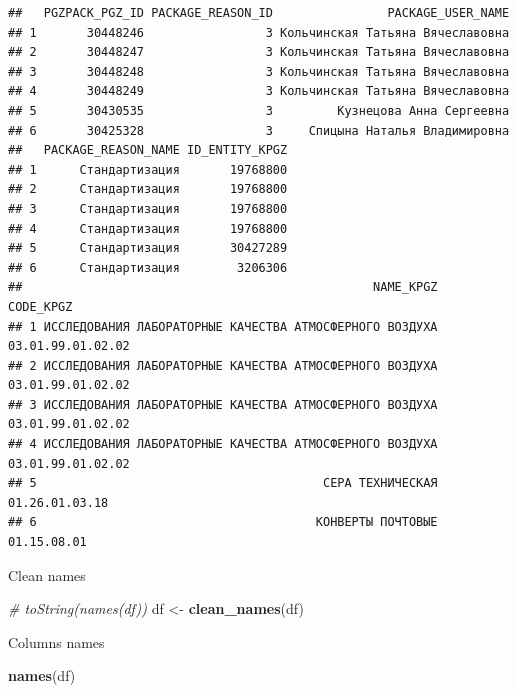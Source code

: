\documentclass[
]{article}
\newenvironment{Shaded}{\begin{snugshade}}{\end{snugshade}}
\newcommand{\CommentTok}[1]{\textcolor[rgb]{0.56,0.35,0.01}{\textit{#1}}}
\newcommand{\FunctionTok}[1]{\textcolor[rgb]{0.13,0.29,0.53}{\textbf{#1}}}
\newcommand{\NormalTok}[1]{#1}
\newcommand{\OtherTok}[1]{\textcolor[rgb]{0.56,0.35,0.01}{#1}}
\begin{document}
\begin{verbatim}
##   PGZPACK_PGZ_ID PACKAGE_REASON_ID                PACKAGE_USER_NAME
## 1       30448246                 3 Кольчинская Татьяна Вячеславовна
## 2       30448247                 3 Кольчинская Татьяна Вячеславовна
## 3       30448248                 3 Кольчинская Татьяна Вячеславовна
## 4       30448249                 3 Кольчинская Татьяна Вячеславовна
## 5       30430535                 3         Кузнецова Анна Сергеевна
## 6       30425328                 3     Спицына Наталья Владимировна
##   PACKAGE_REASON_NAME ID_ENTITY_KPGZ
## 1      Стандартизация       19768800
## 2      Стандартизация       19768800
## 3      Стандартизация       19768800
## 4      Стандартизация       19768800
## 5      Стандартизация       30427289
## 6      Стандартизация        3206306
##                                                 NAME_KPGZ         CODE_KPGZ
## 1 ИССЛЕДОВАНИЯ ЛАБОРАТОРНЫЕ КАЧЕСТВА АТМОСФЕРНОГО ВОЗДУХА 03.01.99.01.02.02
## 2 ИССЛЕДОВАНИЯ ЛАБОРАТОРНЫЕ КАЧЕСТВА АТМОСФЕРНОГО ВОЗДУХА 03.01.99.01.02.02
## 3 ИССЛЕДОВАНИЯ ЛАБОРАТОРНЫЕ КАЧЕСТВА АТМОСФЕРНОГО ВОЗДУХА 03.01.99.01.02.02
## 4 ИССЛЕДОВАНИЯ ЛАБОРАТОРНЫЕ КАЧЕСТВА АТМОСФЕРНОГО ВОЗДУХА 03.01.99.01.02.02
## 5                                        СЕРА ТЕХНИЧЕСКАЯ    01.26.01.03.18
## 6                                       КОНВЕРТЫ ПОЧТОВЫЕ       01.15.08.01
\end{verbatim}

Clean names

\begin{Shaded}
\begin{Highlighting}[]
\CommentTok{\# toString(names(df))}
\NormalTok{df }\OtherTok{\textless{}{-}} \FunctionTok{clean\_names}\NormalTok{(df)}
\end{Highlighting}
\end{Shaded}

Columns names

\begin{Shaded}
\begin{Highlighting}[]
\FunctionTok{names}\NormalTok{(df)}
\end{Highlighting}
\end{Shaded}
\end{document}
